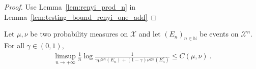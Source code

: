 \begin{proof}
Use Lemma~\ref{lem:renyi_prod_n} in Lemma~\ref{lem:testing_bound_renyi_one_add}
\end{proof}

\begin{theorem}
  \label{thm:testing_bound_chernoff}
  Let $\mu, \nu$ be two probability measures on $\mathcal X$ and let $(E_n)_{n \in \mathbb{N}}$ be events on $\mathcal X^n$. For all $\gamma \in (0,1)$,
  \begin{align*}
  \limsup_{n \to +\infty} \frac{1}{n}\log \frac{1}{\gamma \mu^{\otimes n}(E_n) + (1 - \gamma)\nu^{\otimes n}(E_n^c)}
  \le C(\mu, \nu)
  \: .
  \end{align*}
\end{theorem}

